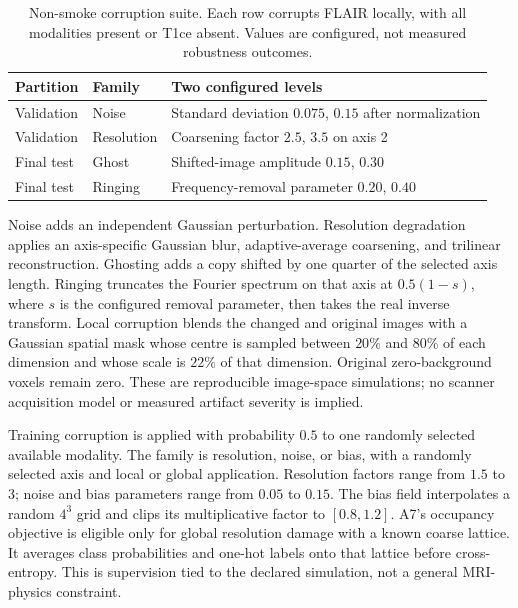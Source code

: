 \documentclass[conference]{IEEEtran}
\begin{document}
\begin{table}[!htbp]
\caption{Non-smoke corruption suite. Each row corrupts FLAIR locally, with all modalities present or T1ce absent. Values are configured, not measured robustness outcomes.}
\label{tab:corruptions}
\centering
\begin{tabularx}{\columnwidth}{@{}l l L@{}}
\toprule
Partition & Family & Two configured levels \\
\midrule
Validation & Noise & Standard deviation $0.075$, $0.15$ after normalization \\
Validation & Resolution & Coarsening factor $2.5$, $3.5$ on axis 2 \\
Final test & Ghost & Shifted-image amplitude $0.15$, $0.30$ \\
Final test & Ringing & Frequency-removal parameter $0.20$, $0.40$ \\
\bottomrule
\end{tabularx}
\end{table}

Noise adds an independent Gaussian perturbation. Resolution degradation applies an axis-specific Gaussian blur, adaptive-average coarsening, and trilinear reconstruction. Ghosting adds a copy shifted by one quarter of the selected axis length. Ringing truncates the Fourier spectrum on that axis at $0.5(1-s)$, where $s$ is the configured removal parameter, then takes the real inverse transform. Local corruption blends the changed and original images with a Gaussian spatial mask whose centre is sampled between $20\%$ and $80\%$ of each dimension and whose scale is $22\%$ of that dimension. Original zero-background voxels remain zero. These are reproducible image-space simulations; no scanner acquisition model or measured artifact severity is implied.

Training corruption is applied with probability $0.5$ to one randomly selected available modality. The family is resolution, noise, or bias, with a randomly selected axis and local or global application. Resolution factors range from $1.5$ to $3$; noise and bias parameters range from $0.05$ to $0.15$. The bias field interpolates a random $4^3$ grid and clips its multiplicative factor to $[0.8,1.2]$. A7's occupancy objective is eligible only for global resolution damage with a known coarse lattice. It averages class probabilities and one-hot labels onto that lattice before cross-entropy. This is supervision tied to the declared simulation, not a general MRI-physics constraint.
\end{document}
